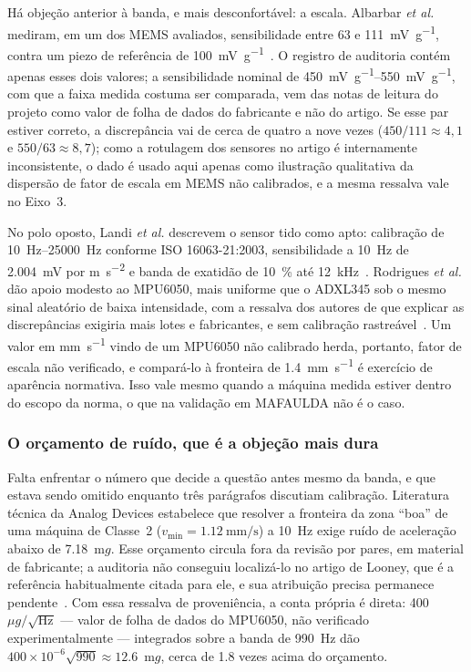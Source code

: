 \documentclass[11pt,a4paper]{article}
\newcommand{\mgf}{\ensuremath{\mathrm{m}g}}
\newcommand{\dens}{\ensuremath{\mu g/\sqrt{\mathrm{Hz}}}}
\begin{document}
Há objeção anterior à banda, e mais desconfortável: a escala. Albarbar \emph{et al.}
mediram, em um dos MEMS avaliados, sensibilidade entre \num{63} e
\SI{111}{\milli\volt\per\gram}, contra um piezo de referência de
\SI{100}{\milli\volt\per\gram}~\cite{albarbar2008}. O registro de auditoria contém apenas
esses dois valores; a sensibilidade nominal de \SIrange{450}{550}{\milli\volt\per\gram},
com que a faixa medida costuma ser comparada, vem das notas de leitura do projeto como
valor de folha de dados do fabricante e não do artigo. Se esse par estiver correto, a
discrepância vai de cerca de quatro a nove vezes ($450/111 \approx 4,1$ e $550/63 \approx
8,7$); como a rotulagem dos sensores no artigo é internamente inconsistente, o dado é
usado aqui apenas como ilustração qualitativa da dispersão de fator de escala em MEMS não
calibrados, e a mesma ressalva vale no Eixo~3.

No polo oposto, Landi \emph{et al.} descrevem o sensor tido como apto: calibração de
\SIrange{10}{25000}{\hertz} conforme ISO 16063-21:2003, sensibilidade a \SI{10}{\hertz} de
\SI{2,004}{\milli\volt} por \si{\meter\per\second\squared} e banda de exatidão de
\SI{10}{\percent} até \SI{12}{\kilo\hertz}~\cite{landi2023}. Rodrigues \emph{et al.}
dão apoio modesto ao MPU6050, mais uniforme que o ADXL345 sob o mesmo sinal aleatório de
baixa intensidade, com a ressalva dos autores de que explicar as discrepâncias exigiria
mais lotes e fabricantes, e sem calibração rastreável~\cite{rodrigues2021}. Um valor em
\si{\milli\meter\per\second} vindo de um MPU6050 não calibrado herda, portanto, fator de
escala não verificado, e compará-lo à fronteira de \SI{1,4}{\milli\meter\per\second} é
exercício de aparência normativa. Isso vale mesmo quando a máquina medida estiver dentro
do escopo da norma, o que na validação em MAFAULDA não é o caso.

\subsubsection{O orçamento de ruído, que é a objeção mais dura}

Falta enfrentar o número que decide a questão antes mesmo da banda, e que estava sendo
omitido enquanto três parágrafos discutiam calibração. Literatura técnica da Analog
Devices estabelece que resolver a fronteira da zona ``boa'' de uma máquina de
Classe~2 ($v_{\min} = \SI{1,12}{\milli\meter\per\second}$) a \SI{10}{\hertz} exige
ruído de aceleração abaixo de \num{7,18}~\mgf. Esse orçamento circula fora
da revisão por pares, em material de fabricante; a auditoria não conseguiu localizá-lo no
artigo de Looney, que é a referência habitualmente citada para ele, e sua
atribuição precisa permanece pendente~\cite{looney2017}. Com essa ressalva de
proveniência, a conta própria é direta: \num{400}~\dens{} --- valor de folha de dados do
MPU6050, não verificado experimentalmente --- integrados sobre a banda de
\SI{990}{\hertz} dão $400\times10^{-6}\sqrt{990} \approx \num{12,6}$~\mgf, cerca de
\num{1,8} vezes acima do orçamento.
\end{document}
